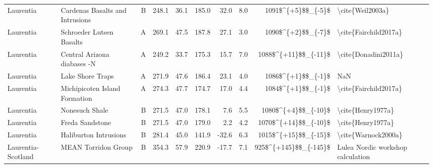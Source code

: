 \begin{longtable}{p{1 in}p{1 in}rrrrrrr}
                     Laurentia &                    Cardenas Basalts and Intrusions &      B &     248.1 &      36.1 & 185.0 &  32.0 &       8.0 &     1091\$\textasciicircum \{+5\}\$\$\_\{-5\}\$ &                                   \textbackslash cite\{Weil2003a\} \\
                     Laurentia &                           Schroeder Lutsen Basalts &      A &     269.1 &      47.5 & 187.8 &  27.1 &       3.0 &     1090\$\textasciicircum \{+2\}\$\$\_\{-7\}\$ &                              \textbackslash cite\{Fairchild2017a\} \\
                     Laurentia &                        Central Arizona diabases -N &      A &     249.2 &      33.7 & 175.3 &  15.7 &       7.0 &   1088\$\textasciicircum \{+11\}\$\$\_\{-11\}\$ &                               \textbackslash cite\{Donadini2011a\} \\
                     Laurentia &                                   Lake Shore Traps &      A &     271.9 &      47.6 & 186.4 &  23.1 &       4.0 &     1086\$\textasciicircum \{+1\}\$\$\_\{-1\}\$ &                                                NaN \\
                     Laurentia &                      Michipicoten Island Formation &      A &     274.3 &      47.7 & 174.7 &  17.0 &       4.4 &     1084\$\textasciicircum \{+1\}\$\$\_\{-1\}\$ &                              \textbackslash cite\{Fairchild2017a\} \\
                     Laurentia &                                     Nonesuch Shale &      B &     271.5 &      47.0 & 178.1 &   7.6 &       5.5 &    1080\$\textasciicircum \{+4\}\$\$\_\{-10\}\$ &                                  \textbackslash cite\{Henry1977a\} \\
                     Laurentia &                                    Freda Sandstone &      B &     271.5 &      47.0 & 179.0 &   2.2 &       4.2 &   1070\$\textasciicircum \{+14\}\$\$\_\{-10\}\$ &                                  \textbackslash cite\{Henry1977a\} \\
                     Laurentia &                              Haliburton Intrusions &      B &     281.4 &      45.0 & 141.9 & -32.6 &       6.3 &   1015\$\textasciicircum \{+15\}\$\$\_\{-15\}\$ &                                \textbackslash cite\{Warnock2000a\} \\
            Laurentia-Scotland &                                MEAN Torridon Group &      B &     354.3 &      57.9 & 220.9 & -17.7 &       7.1 &  925\$\textasciicircum \{+145\}\$\$\_\{-145\}\$ &                  Lulea Nordic workshop calculation \\

\end{longtable}
